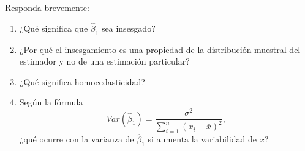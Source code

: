 \documentclass[11pt]{article}
\begin{document}
\begin{enumerate}[label=\textbf{Ejercicio \arabic*.}, leftmargin=*]
    Responda brevemente:
    \begin{enumerate}[label=\alph*)]
        \item ¿Qué significa que $\hat{\beta}_1$ sea insesgado?
        \item ¿Por qué el insesgamiento es una propiedad de la distribución muestral del estimador y no de una estimación particular?
        \item ¿Qué significa homocedasticidad?
        \item Según la fórmula
        \[
            Var(\hat{\beta}_1)=\frac{\sigma^2}{\sum_{i=1}^n(x_i-\bar{x})^2},
        \]
        ¿qué ocurre con la varianza de $\hat{\beta}_1$ si aumenta la variabilidad de $x$?
    \end{enumerate}

\end{enumerate}
\end{document}
